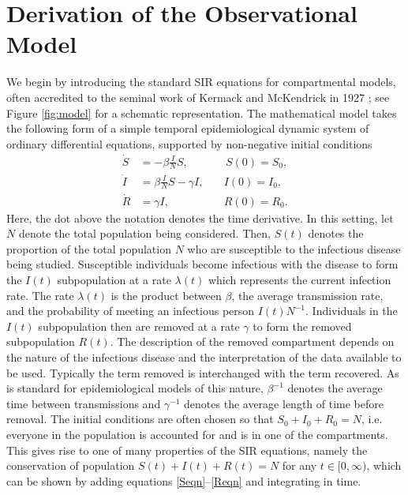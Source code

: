 \documentclass{article}
\begin{document}
\section{Derivation of the Observational Model}
\label{Obs_model}
We begin by introducing the standard SIR equations for compartmental models, often accredited to the seminal work of Kermack and McKendrick in 1927 \cite{KM27}; see Figure \ref{fig:model} for a schematic representation. The mathematical model takes the following form of a simple temporal epidemiological dynamic system of ordinary differential equations, supported by non-negative initial conditions
%
\begin{align}
    \dot{S} &= - \beta \frac{I}{N} S, \quad & \, S(0) = S_0, \label{Seqn} \\
    \dot{I} &= \beta \frac{I}{N} S - \gamma I, \quad & I(0) = I_0, \label{Ieqn} \\
    \dot{R} &= \gamma I, \quad & R(0) = R_0. \label{Reqn}
\end{align}
%
Here, the dot above the notation denotes the time derivative. In this setting, let $N$ denote the total population being considered. Then, $S(t)$ denotes the proportion of the total population $N$ who are susceptible to the infectious disease being studied. Susceptible individuals become infectious with the disease to form the $I(t)$ subpopulation at a rate $\lambda(t)$ which represents the current infection rate. The rate $\lambda(t)$ is the product between $\beta$, the average transmission rate, and the probability of meeting an infectious person $I(t)N^{-1}$. Individuals in the $I(t)$ subpopulation then are removed at a rate $\gamma$ to form the removed subpopulation $R(t)$. The description of the removed compartment depends on the nature of the infectious disease and the interpretation of the data available to be used. Typically the term removed is interchanged with the term recovered. As is standard for epidemiological models of this nature, $\beta^{-1}$ denotes the average time between transmissions and $\gamma^{-1}$ denotes the average length of time before removal. The initial conditions are often chosen so that $S_0 + I_0 + R_0 = N$, i.e. everyone in the population is accounted for and is in one of the compartments. This gives rise to one of many properties of the SIR equations, namely the conservation of population $S(t) + I(t) + R(t) = N$ for any $t \in [0,\infty)$, which can be shown by adding equations \eqref{Seqn}--\eqref{Reqn} and integrating in time. 


\end{document}
